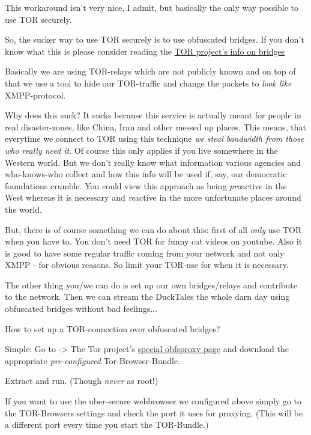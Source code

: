\documentclass{article}
\begin{document}
 This workaround isn't very nice, I admit, but basically the only way possible to use TOR securely. 


 So, the sucker way to use TOR securely is to use obfuscated bridges. If you don't know what this is please consider reading the \href{https://www.torproject.org/docs/bridges}{TOR project's info on bridges}


 Basically we are using TOR-relays which are not publicly known and on top of that we use a tool to hide our TOR-traffic and change the packets to \emph{look like} XMPP-protocol. 


 Why does this suck? It sucks because this service is actually meant for people in real disaster-zones, like China, Iran and other messed up places. This means, that everytime we connect to TOR using this technique \emph{we steal bandwidth from those who really need it}. Of course this only applies if you live somewhere in the Western world. But we don't really know what information various agencies and who-knows-who collect and how this info will be used if, say, our democratic foundations crumble. You could view this approach as being \emph{pro}active in the West whereas it is necessary and \emph{re}active in the more unfortunate places around the world. 


 But, there is of course something we can do about this: first of all \emph{only} use TOR when you have to. You don't need TOR for funny cat videos on youtube. Also it is good to have some regular traffic coming from your network and not only XMPP - for obvious reasons. So limit your TOR-use for when it is necessary. 


 The other thing you/we can do is set up our own bridges/relays and contribute to the network. Then we can stream the DuckTales the whole darn day using obfuscated bridges without bad feelings... 


 How to set up a TOR-connection over obfuscated bridges?


 Simple: Go to -> The Tor project's \href{https://www.torproject.org/projects/obfsproxy.html.en}{special obfsproxy page} and download the appropriate \emph{pre-configured} Tor-Browser-Bundle. 


 Extract and run. (Though \emph{never} as root!)


 If you want to use the uber-secure webbrowser we configured above simply go to the TOR-Browsers settings and check the port it uses for proxying. (This will be a different port every time you start the TOR-Bundle.) 
\end{document}
